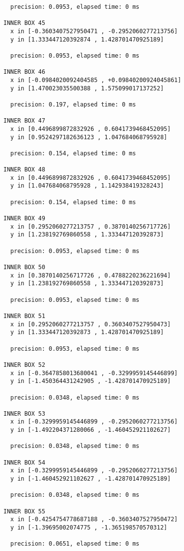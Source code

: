 \begin{verbatim}
  precision: 0.0953, elapsed time: 0 ms

INNER BOX 45
  x in [-0.3603407527950471 , -0.2952060277213756]
  y in [1.333447120392874 , 1.428701470925189]

  precision: 0.0953, elapsed time: 0 ms

INNER BOX 46
  x in [-0.0984020092404585 , +0.09840200924045861]
  y in [1.470023035500388 , 1.575099017137252]

  precision: 0.197, elapsed time: 0 ms

INNER BOX 47
  x in [0.4496899872832926 , 0.6041739468452095]
  y in [0.9524297182636123 , 1.047684068795928]

  precision: 0.154, elapsed time: 0 ms

INNER BOX 48
  x in [0.4496899872832926 , 0.6041739468452095]
  y in [1.047684068795928 , 1.142938419328243]

  precision: 0.154, elapsed time: 0 ms

INNER BOX 49
  x in [0.2952060277213757 , 0.3870140256717726]
  y in [1.238192769860558 , 1.333447120392873]

  precision: 0.0953, elapsed time: 0 ms

INNER BOX 50
  x in [0.3870140256717726 , 0.4788220236221694]
  y in [1.238192769860558 , 1.333447120392873]

  precision: 0.0953, elapsed time: 0 ms

INNER BOX 51
  x in [0.2952060277213757 , 0.3603407527950473]
  y in [1.333447120392873 , 1.428701470925189]

  precision: 0.0953, elapsed time: 0 ms

INNER BOX 52
  x in [-0.3647858013680041 , -0.3299959145446899]
  y in [-1.450364431242905 , -1.428701470925189]

  precision: 0.0348, elapsed time: 0 ms

INNER BOX 53
  x in [-0.3299959145446899 , -0.2952060277213756]
  y in [-1.492204371280066 , -1.460452921102627]

  precision: 0.0348, elapsed time: 0 ms

INNER BOX 54
  x in [-0.3299959145446899 , -0.2952060277213756]
  y in [-1.460452921102627 , -1.428701470925189]

  precision: 0.0348, elapsed time: 0 ms

INNER BOX 55
  x in [-0.4254754778687188 , -0.3603407527950472]
  y in [-1.39695002074775 , -1.365198570570312]

  precision: 0.0651, elapsed time: 0 ms


\end{verbatim}

